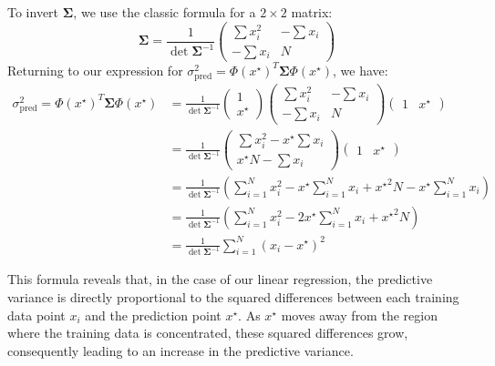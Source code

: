 To invert $\boldsymbol{\Sigma}$, we use the classic formula for a $2 \times 2$ matrix:
\[
    \boldsymbol{\Sigma} = \frac{1}{\det \boldsymbol{\Sigma}^{-1}} \begin{pmatrix}
         \sum x_i^2 & -  \sum x_i \\
        -  \sum x_i & N
    \end{pmatrix}
\]
Returning to our expression for $ \sigma^2_{\text{pred}} = \Phi (x^\star ) ^T \boldsymbol{\Sigma} \Phi (x^\star )$, we have:
\begin{align*}
    \sigma^2_{\text{pred}} = \Phi (x^\star ) ^T \boldsymbol{\Sigma} \Phi (x^\star ) &= \frac{1}{\det \boldsymbol{\Sigma}^{-1}} \begin{pmatrix}
        1 \\
        x^\star 
    \end{pmatrix} \begin{pmatrix}
         \sum x_i^2 & -  \sum x_i \\
        -  \sum x_i & N
    \end{pmatrix}\begin{pmatrix}
        1 & x^\star 
    \end{pmatrix} \\
    &= \frac{1}{\det \boldsymbol{\Sigma}^{-1}} \begin{pmatrix} \sum x_i^2 - x^\star  \sum x_i \\ x^\star N -  \sum x_i\end{pmatrix} \begin{pmatrix}1 & x^\star \end{pmatrix} \\
    &= \frac{1}{\det \boldsymbol{\Sigma}^{-1}}\left( \sum_{i=1}^{N} x_i^2 - x^\star  \sum_{i=1}^{N} x_i + {x^\star }^2 N - x^\star  \sum_{i=1}^{N} x_i\right) \\
    &= \frac{1}{\det \boldsymbol{\Sigma}^{-1}}\left( \sum_{i=1}^{N} x_i^2 - 2 x^\star  \sum_{i=1}^{N} x_i + {x^\star }^2 N\right) \\
    &= \frac{1}{\det \boldsymbol{\Sigma}^{-1}} \sum_{i=1}^{N} \left(x_i - x^\star \right)^2
\end{align*}

This formula reveals that, in the case of our linear regression, the predictive variance is directly proportional to the squared differences between each training data point $x_i$ and the prediction point $x^\star$. As $x^\star$ moves away from the region where the training data is concentrated, these squared differences grow, consequently leading to an increase in the predictive variance.

